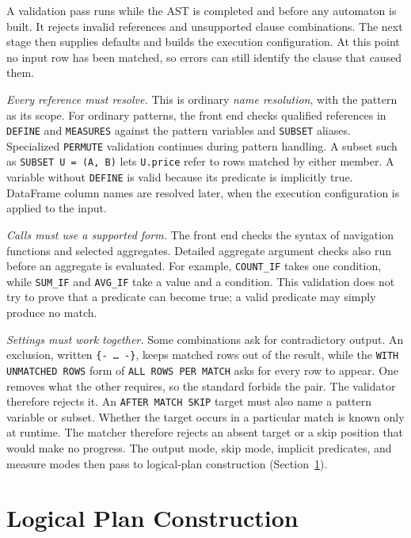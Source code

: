 A validation pass runs while the AST is completed and before any
automaton is built.  It rejects invalid references and unsupported
clause combinations.  The next stage then supplies defaults and builds
the execution configuration.  At this point no input row has been
matched, so errors can still identify the clause that caused them.

\emph{Every reference must resolve.}  This is ordinary \emph{name
resolution}, with the pattern as its scope.  For ordinary patterns, the
front end checks qualified references in \texttt{DEFINE} and
\texttt{MEASURES} against the pattern variables and \texttt{SUBSET}
aliases.  Specialized \texttt{PERMUTE} validation continues during
pattern handling.  A subset such as \texttt{SUBSET U = (A, B)} lets
\texttt{U.price} refer to rows matched by either member.  A variable
without \texttt{DEFINE} is valid because its predicate is implicitly
true.  DataFrame column names are resolved later, when the execution
configuration is applied to the input.

\emph{Calls must use a supported form.}  The front end checks the
syntax of navigation functions and selected aggregates.  Detailed
aggregate argument checks also run before an aggregate is evaluated.
For example, \texttt{COUNT\_IF} takes one condition, while
\texttt{SUM\_IF} and \texttt{AVG\_IF} take a value and a condition.
This validation does not try to prove that a predicate can become true;
a valid predicate may simply produce no match.

\emph{Settings must work together.}  Some combinations ask for
contradictory output.  An exclusion, written \texttt{\{-\ \ldots\ -\}},
keeps matched rows out of the result, while the
\texttt{WITH UNMATCHED ROWS} form of \texttt{ALL ROWS PER MATCH} asks
for every row to appear.  One removes what the other requires, so the
standard forbids the pair.  The validator therefore rejects it.  An
\texttt{AFTER MATCH SKIP} target must also name a pattern variable or
subset.  Whether the target occurs in a particular match is known only
at runtime.  The matcher therefore rejects an absent target or a skip
position that would make no progress.  The output mode, skip mode,
implicit predicates, and measure modes then pass to logical-plan
construction (Section~\ref{sec:meth-logical}).

\section{Logical Plan Construction}
\label{sec:meth-logical}

